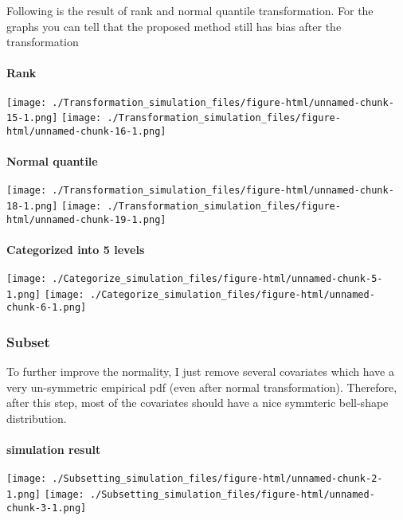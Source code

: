 \documentclass[]{article}
\let\oldparagraph\paragraph
\renewcommand{\paragraph}[1]{\oldparagraph{#1}\mbox{}}
\begin{document}
Following is the result of rank and normal quantile transformation. For
the graphs you can tell that the proposed method still has bias after
the transformation

\paragraph{Rank}\label{rank}

\texttt{[image: ./Transformation\_simulation\_files/figure-html/unnamed-chunk-15-1.png]}
\texttt{[image: ./Transformation\_simulation\_files/figure-html/unnamed-chunk-16-1.png]}

\paragraph{Normal quantile}\label{normal-quantile}

\texttt{[image: ./Transformation\_simulation\_files/figure-html/unnamed-chunk-18-1.png]}
\texttt{[image: ./Transformation\_simulation\_files/figure-html/unnamed-chunk-19-1.png]}

\paragraph{Categorized into 5 levels}\label{categorized-into-5-levels}

\texttt{[image: ./Categorize\_simulation\_files/figure-html/unnamed-chunk-5-1.png]}
\texttt{[image: ./Categorize\_simulation\_files/figure-html/unnamed-chunk-6-1.png]}

\newpage

\subsubsection{Subset}\label{subset}

To further improve the normality, I just remove several covariates which
have a very un-symmetric empirical pdf (even after normal
transformation). Therefore, after this step, most of the covariates
should have a nice symmteric bell-shape distribution.

\paragraph{simulation result}\label{simulation-result-1}

\texttt{[image: ./Subsetting\_simulation\_files/figure-html/unnamed-chunk-2-1.png]}
\texttt{[image: ./Subsetting\_simulation\_files/figure-html/unnamed-chunk-3-1.png]}
\end{document}
